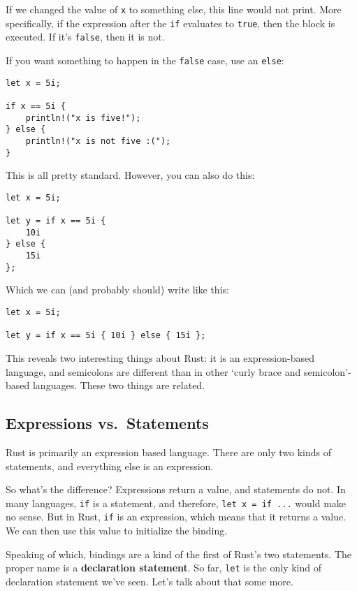 \documentclass[]{article}
\begin{document}
If we changed the value of \texttt{x} to something else, this line would
not print. More specifically, if the expression after the \texttt{if}
evaluates to \texttt{true}, then the block is executed. If it's
\texttt{false}, then it is not.

If you want something to happen in the \texttt{false} case, use an
\texttt{else}:

\begin{verbatim}
let x = 5i;

if x == 5i {
    println!("x is five!");
} else {
    println!("x is not five :(");
}
\end{verbatim}

This is all pretty standard. However, you can also do this:

\begin{verbatim}
let x = 5i;

let y = if x == 5i {
    10i
} else {
    15i
};
\end{verbatim}

Which we can (and probably should) write like this:

\begin{verbatim}
let x = 5i;

let y = if x == 5i { 10i } else { 15i };
\end{verbatim}

This reveals two interesting things about Rust: it is an
expression-based language, and semicolons are different than in other
`curly brace and semicolon'-based languages. These two things are
related.

\subsection{Expressions vs.~Statements}\label{expressions-vs.statements}

Rust is primarily an expression based language. There are only two kinds
of statements, and everything else is an expression.

So what's the difference? Expressions return a value, and statements do
not. In many languages, \texttt{if} is a statement, and therefore,
\texttt{let x = if ...} would make no sense. But in Rust, \texttt{if} is
an expression, which means that it returns a value. We can then use this
value to initialize the binding.

Speaking of which, bindings are a kind of the first of Rust's two
statements. The proper name is a \textbf{declaration statement}. So far,
\texttt{let} is the only kind of declaration statement we've seen. Let's
talk about that some more.
\end{document}
